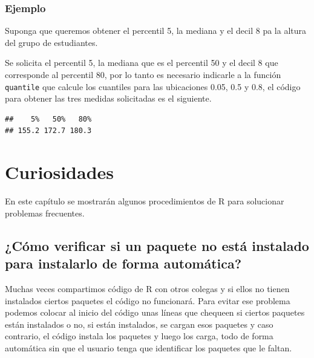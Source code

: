 \documentclass[10pt,]{krantz}
\makeatletter
\newenvironment{Shaded}{\begin{snugshade}}{\end{snugshade}}
\newcommand{\KeywordTok}[1]{\textcolor[rgb]{0.13,0.29,0.53}{\textbf{#1}}}
\newcommand{\DataTypeTok}[1]{\textcolor[rgb]{0.13,0.29,0.53}{#1}}
\newcommand{\FloatTok}[1]{\textcolor[rgb]{0.00,0.00,0.81}{#1}}
\newcommand{\OperatorTok}[1]{\textcolor[rgb]{0.81,0.36,0.00}{\textbf{#1}}}
\newcommand{\NormalTok}[1]{#1}
\newenvironment{kframe}{%
\medskip{}
\setlength{\fboxsep}{.8em}
 \def\at@end@of@kframe{}%
 \ifinner\ifhmode%
  \def\at@end@of@kframe{\end{minipage}}%
  \begin{minipage}{\columnwidth}%
 \fi\fi%
 \def\FrameCommand##1{\hskip\@totalleftmargin \hskip-\fboxsep
 \colorbox{shadecolor}{##1}\hskip-\fboxsep
     \hskip-\linewidth \hskip-\@totalleftmargin \hskip\columnwidth}%
 \MakeFramed {\advance\hsize-\width
   \@totalleftmargin\z@ \linewidth\hsize
   \@setminipage}}%
 {\par\unskip\endMakeFramed%
 \at@end@of@kframe}
\renewenvironment{Shaded}{\begin{kframe}}{\end{kframe}}
\makeatother
\begin{document}
\subsubsection*{Ejemplo}\label{ejemplo-27}

Suponga que queremos obtener el percentil 5, la mediana y el decil 8 pa
la altura del grupo de estudiantes.

Se solicita el percentil 5, la mediana que es el percentil 50 y el decil
8 que corresponde al percentil 80, por lo tanto es necesario indicarle a
la función \texttt{quantile} que calcule los cuantiles para las
ubicaciones 0.05, 0.5 y 0.8, el código para obtener las tres medidas
solicitadas es el siguiente.

\begin{Shaded}
\end{Shaded}

\begin{verbatim}
##    5%   50%   80% 
## 155.2 172.7 180.3
\end{verbatim}

\section{Curiosidades}\label{curio}

En este capítulo se mostrarán algunos procedimientos de R para
solucionar problemas frecuentes.

\subsection{¿Cómo verificar si un paquete no está instalado para
instalarlo de forma
automática?}\label{como-verificar-si-un-paquete-no-esta-instalado-para-instalarlo-de-forma-automatica}

Muchas veces compartimos código de R con otros colegas y si ellos no
tienen instalados ciertos paquetes el código no funcionará. Para evitar
ese problema podemos colocar al inicio del código unas líneas que
chequeen si ciertos paquetes están instalados o no, si están instalados,
se cargan esos paquetes y caso contrario, el código instala los paquetes
y luego los carga, todo de forma automática sin que el usuario tenga que
identificar los paquetes que le faltan.
\end{document}
